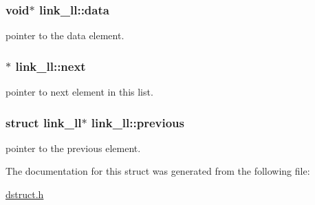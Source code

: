 \subsubsection[{\texorpdfstring{data}{data}}]{\setlength{\rightskip}{0pt plus 5cm}void$\ast$ link\+\_\+ll\+::data}\hypertarget{structlink__ll_ae86aee74bb21358f58a36f9d75b04ecb}{}\label{structlink__ll_ae86aee74bb21358f58a36f9d75b04ecb}
pointer to the data element. 
\subsubsection[{\texorpdfstring{next}{next}}]{$\ast$ link\+\_\+ll\+::next}\hypertarget{structlink__ll_a017a3db913bb97caa35e7c4b2be88651}{}\label{structlink__ll_a017a3db913bb97caa35e7c4b2be88651}
pointer to next element in this list. 
\subsubsection[{\texorpdfstring{previous}{previous}}]{\setlength{\rightskip}{0pt plus 5cm}struct {\bf link\+\_\+ll}$\ast$ link\+\_\+ll\+::previous}\hypertarget{structlink__ll_a48b96c80d57fcaf97793ae54d02daa49}{}\label{structlink__ll_a48b96c80d57fcaf97793ae54d02daa49}
pointer to the previous element. 

The documentation for this struct was generated from the following file\+:\begin{DoxyCompactItemize}
\item 
\hyperlink{dstruct_8h}{dstruct.\+h}\end{DoxyCompactItemize}
